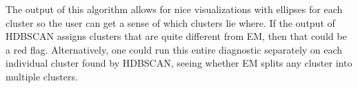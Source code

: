 \documentclass[11pt]{article}
\begin{document}
The output of this algorithm allows for nice visualizations with ellipses for each cluster so the user can get a sense of which clusters lie where. If the output of HDBSCAN assigns clusters that are quite different from EM, then that could be a red flag. Alternatively, one could run this entire diagnostic separately on each individual cluster found by HDBSCAN, seeing whether EM splits any cluster into multiple clusters.



\end{document}
